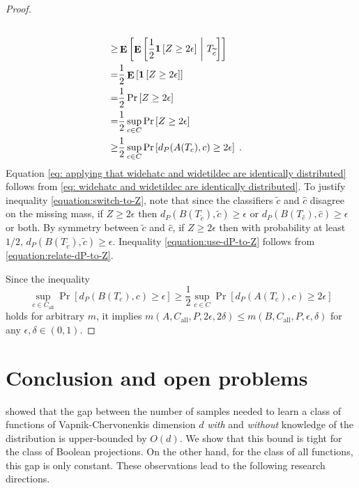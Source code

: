\documentclass[11pt]{article}
\newcommand{\indicator}[1]{\mathbf{1}\left[{#1}\right]}
\DeclareMathOperator{\Exp}{\mathbf{E}}
\begin{document}
\begin{proof}
\begin{align}
  \label{eq: applying that widehatc and widetildec are identically distributed}\\
\ge & \Exp \left[ \Exp \left[ \frac{1}{2} \indicator{Z \ge 2 \epsilon} ~\middle|~ T_{\widetilde{c}} \right] \right] \label{equation:switch-to-Z} \\
= & \frac{1}{2} \Exp \left[ \indicator{Z \ge 2 \epsilon} \right] \notag \\
= & \frac{1}{2} \Pr \left[ Z \ge 2 \epsilon \right] \notag \\
= & \frac{1}{2} \sup_{c \in C} \Pr \left[ Z \ge 2 \epsilon \right] \notag \\
\ge & \frac{1}{2} \sup_{c \in C} \Pr \left[ d_P(A(T_c), c) \ge 2 \epsilon \right] \label{equation:use-dP-to-Z} \; .
\end{align}
Equation \eqref{eq: applying that widehatc and widetildec are identically distributed} follows from \eqref{eq: widehatc and widetildec are identically distributed}.
To justify inequality \eqref{equation:switch-to-Z}, note that since
the classifiers $\widetilde{c}$ and $\widehat{c}$ disagree on the missing mass,
if $Z \ge 2\epsilon$ then $d_P(B(T_{\widetilde{c}}), \widetilde{c})
\ge \epsilon$ or $d_P(B(T_{\widehat c}), \widehat c) \ge \epsilon$ or both.
By symmetry between $\widetilde{c}$ and $\widehat{c}$, if $Z \ge 2\epsilon$
then with probability at least $1/2$, $d_P(B(T_{\widetilde{c}}), \widetilde{c})
\ge \epsilon$. Inequality \eqref{equation:use-dP-to-Z} follows from
\eqref{equation:relate-dP-to-Z}.

Since the inequality
$$
\sup_{c \in C_{\text{all}}} \Pr[d_P(B(T_c),c) \ge \epsilon] \ge \frac{1}{2} \sup_{c \in C} \Pr \left[ d_P(A(T_c), c) \ge 2 \epsilon \right]
$$
holds for arbitrary $m$, it
implies $m(A,C_{\text{all}},P,2\epsilon,2\delta) \le m(B,C_{\text{all}},P,\epsilon,\delta)$ for any $\epsilon, \delta \in (0,1)$.
\end{proof}



\section{Conclusion and open problems}
\label{section:conclusions}

\citet{Darnstadt-Simon-Szorenyi-2013} showed that the gap between the number of
samples needed to learn a class of functions of Vapnik-Chervonenkis dimension
$d$ \emph{with} and \emph{without} knowledge of the distribution is
upper-bounded by $O(d)$. We show that this bound is tight for the class of
Boolean projections. On the other hand, for the class of all functions, this gap
is only constant. These observations lead to the following research directions.
\end{document}
